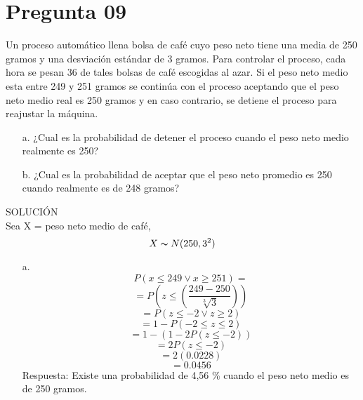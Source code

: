 \documentclass[10pt,a4paper]{article}
\begin{document}
\section{Pregunta 09}
Un proceso automático llena bolsa de café cuyo peso neto tiene una media  de  250  gramos  y  una  desviación  estándar  de  3  gramos.  Para controlar el proceso, cada hora se pesan 36 de tales bolsas de café escogidas al azar. Si el peso neto medio esta entre 249 y 251 gramos se continúa con el proceso aceptando que el peso neto medio real es 250 gramos y en caso contrario, se detiene el proceso para reajustar la máquina.
\begin{itemize}
\item[a.]¿Cual  es  la  probabilidad  de  detener  el  proceso  cuando  el  peso  neto  medio realmente es 250?
\item[b.]¿Cual es la probabilidad de aceptar que el peso neto promedio es 250 cuando realmente es de 248 gramos?
\end{itemize}
SOLUCIÓN\\
Sea X = peso neto medio de café, $$ X\thicksim N (250,3^2)$$
\begin{itemize}
\item[a.]
$$P(x\leq249 \vee x\geq251) = $$
$$= P(z\leq(\dfrac{249-250}{\sqrt[3]{3}}))$$
$$= P(z\leq-2 \vee z\geq2)$$
$$= 1-P(-2\leq z \leq2)$$
$$= 1-(1-2P(z\leq-2))$$
$$= 2P(z\leq-2)$$
$$= 2(0.0228)$$
$$= 0.0456$$
Respuesta: Existe una probabilidad de 4,56 \% cuando el peso neto medio es de 250 gramos.
\end{itemize}
\end{document}
